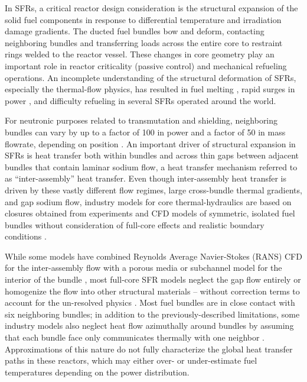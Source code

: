In SFRs, a critical reactor design consideration is the structural expansion of
the solid fuel components in response to differential temperature and
irradiation damage gradients. The ducted fuel bundles bow and deform,
contacting neighboring bundles and transferring loads across the entire core to
restraint rings welded to the reactor vessel. These changes in core geometry
play an important role in reactor criticality (passive control) and mechanical
refueling operations.  An incomplete understanding of the structural
deformation of SFRs, especially the thermal-flow physics, has resulted in fuel
melting \cite{brittan}, rapid surges in power \cite{chaumont}, and difficulty
refueling \cite{shields} in several SFRs operated around the world.

For neutronic purposes related to transmutation and shielding, neighboring
bundles can vary by up to a factor of 100 in power and a factor of 50 in mass
flowrate, depending on position \cite{abr}. An important driver of structural
expansion in SFRs is heat transfer both within bundles and across thin gaps
between adjacent bundles that contain laminar sodium flow, a heat transfer
mechanism referred to as ``inter-assembly'' heat transfer. Even though
inter-assembly heat transfer is driven by these vastly different flow regimes,
large cross-bundle thermal gradients, and gap sodium flow, industry models for
core thermal-hydraulics are based on closures obtained from experiments and CFD
models of symmetric, isolated fuel bundles without consideration of 
full-core effects and realistic boundary conditions \cite{touran}. 

While some models have combined Reynolds Average Navier-Stokes (RANS) CFD for the
inter-assembly flow with a porous media or subchannel model for the interior of
the bundle \cite{wang2020,gerschenfeld}, most full-core SFR models neglect the
gap flow entirely \cite{touran} or homogenize the flow into other structural
materials \cite{fiorina_of} -- without correction terms to account for the
un-resolved physics \cite{touran,fiorina_of}. Most fuel bundles are in close
contact with six neighboring bundles; in addition to the previously-described
limitations, some industry models also neglect heat flow azimuthally around
bundles by assuming that each bundle face only communicates thermally with one
neighbor \cite{touran}. Approximations of this nature do not fully characterize
the global heat transfer paths in these reactors, which may either over- or
under-estimate fuel temperatures depending on the power distribution.

